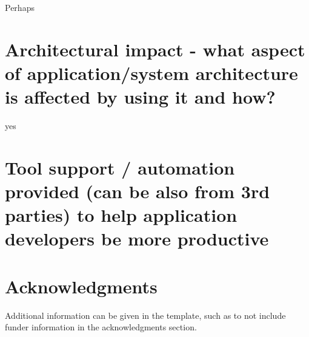 \documentclass[fleqn,12pt]{olplainarticle}
\begin{document}
Perhaps

\section{Architectural impact - what aspect of application/system architecture is affected by using it and how?}
yes
\section{Tool support / automation provided (can be also from 3rd parties) to help application developers be more productive}

\section{Acknowledgments}

Additional information can be given in the template, such as to not include funder information in the acknowledgments section.


\end{document}
